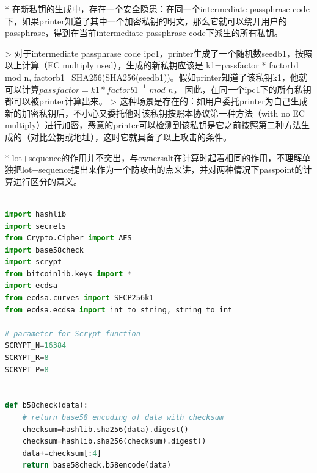 * 在新私钥的生成中，存在一个安全隐患：在同一个intermediate passphrase code下，如果printer知道了其中一个加密私钥的明文，那么它就可以绕开用户的passphrase，得到在当前intermediate passphrase code下派生的所有私钥。
  
> 对于intermediate passphrase code ipc1，printer生成了一个随机数seedb1，按照以上计算（EC multiply used），生成的新私钥应该是 k1=passfactor * factorb1 mod n, factorb1=SHA256(SHA256(seedb1))。假如printer知道了该私钥k1，他就可以计算$passfactor=k1 * factorb1^{-1}$ $mod$ $n$， 因此，在同一个ipc1下的所有私钥都可以被printer计算出来。  
> 这种场景是存在的：如用户委托printer为自己生成新的加密私钥后，不小心又委托他对该私钥按照本协议第一种方法（with no EC multiply）进行加密，恶意的printer可以检测到该私钥是它之前按照第二种方法生成的（对比公钥或地址），这时它就具备了以上攻击的条件。

* lot+sequence的作用并不突出，与ownersalt在计算时起着相同的作用，不理解单独把lot+sequence提出来作为一个防攻击的点来讲，并对两种情况下passpoint的计算进行区分的意义。

\begin{lstlisting}[language=python, caption = 下面是用python编写的测试代码, label=lst-baddersig]

import hashlib 
import secrets
from Crypto.Cipher import AES
import base58check
import scrypt
from bitcoinlib.keys import *
import ecdsa
from ecdsa.curves import SECP256k1
from ecdsa.ecdsa import int_to_string, string_to_int

# parameter for Scrypt function
SCRYPT_N=16384
SCRYPT_R=8
SCRYPT_P=8


def b58check(data):
	# return base58 encoding of data with checksum
	checksum=hashlib.sha256(data).digest()
	checksum=hashlib.sha256(checksum).digest()
	data+=checksum[:4]
	return base58check.b58encode(data)
\end{lstlisting}

